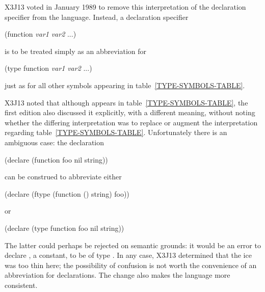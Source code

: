 \begin{new}
X3J13 voted in January 1989
to remove this interpretation
of the  declaration specifier from the language.
Instead, a declaration specifier
\begin{lisp}
(function {\it var1} {\it var2} ...)
\end{lisp}
is to be treated simply as an abbreviation for
\begin{lisp}
(type function {\it var1} {\it var2} ...)
\end{lisp}
just as for all other symbols appearing in table~\ref{TYPE-SYMBOLS-TABLE}.

X3J13 noted that although  appears in
table~\ref{TYPE-SYMBOLS-TABLE}, the first edition also discussed it
explicitly, with a different meaning,
without noting whether the differing
interpretation was to replace or augment the
interpretation regarding table~\ref{TYPE-SYMBOLS-TABLE}.  Unfortunately
there is an ambiguous case: the declaration
\begin{lisp}
(declare (function foo nil string))
\end{lisp}
can be construed to abbreviate either
\begin{lisp}
(declare (ftype (function () string) foo))
\end{lisp}
or
\begin{lisp}
(declare (type function foo nil string))
\end{lisp}
The latter could perhaps be rejected on semantic grounds: it would be an
error to declare , a constant, to be of type .
In any case, X3J13 determined that the ice was too thin here;
the possibility of confusion is not worth the convenience of
an abbreviation for  declarations.
The change also makes the language more consistent.
\end{new}

